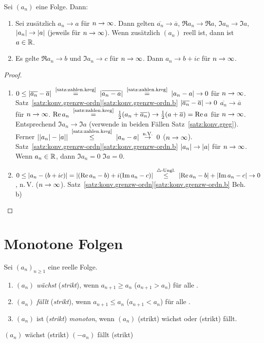 \documentclass[12pt]{scrreprt}
\begin{document}
\begin{satz}
\label{satz:konv.grenzw-komplex}
Sei $(a_n)$ eine Folge. Dann:
\begin{enumerate}
\item Sei zusätzlich $a_n\to a$ für $n\rightarrow\infty$. Dann gelten $\overline{a_n}\to\overline{a}$, $\Re{a_n}\to\Re{a}$, $\Im{a_n}\to\Im{a}$, $\left\lvert a_n\right\lvert\to\left\lvert a\right\lvert$ (jeweils für $n\rightarrow\infty$). Wenn zusätzlich $(a_n)$ reell ist, dann ist $a\in\mathbb{R}$.
\item Es gelte $\Re{a_n}\to b$ und $\Im{a_n}\to c$ für $n\rightarrow\infty$. Dann $a_n\to b+ic$ für $n\rightarrow\infty$.
\end{enumerate}
\end{satz}
\begin{proof}
\begin{enumerate}
\item $0\le\abs{\overline{a_n}-\overline{a}} \nach{=}{\ref{satz:zahlen.kreg}} \abs{\overline{a_n-a}} \nach{=}{\ref{satz:zahlen.kreg}} \abs{a_n-a}\to0$ für $n\rightarrow\infty$. Satz~\ref{satz:konv.grenzw-ordn}\ref{satz:konv.grenzw-ordn.b} \folgt $\left\lvert\overline{a_n}-\overline{a}\right\lvert\to0$ \folgt $\overline{a_n}\to\overline{a}$ für $n\rightarrow\infty$. \folgt $\Re{a_n} \nach{=}{\ref{satz:zahlen.kreg}} \frac12(a_n+\overline{a_n})\to\frac12(a+\overline{a})=\Re{a}$ für $n\rightarrow\infty$. Entsprechend $\Im{a_n}\to\Im{a}$ (verwende in beiden Fällen Satz~\ref{satz:konv.greg}). Ferner $\abs{\abs{a_n}-\abs{a}} \nach{\le}{\ref{satz:zahlen.kreg}} |a_n-a| \nach{\ra}{n.V.} 0$ ($n\rightarrow\infty$). Satz~\ref{satz:konv.grenzw-ordn}\ref{satz:konv.grenzw-ordn.b} \folgt $\left\lvert a_n\right\lvert\to\left\lvert a\right\lvert$ für $n\rightarrow\infty$. Wenn $a_n\in\mathbb{R}$, dann $\Im{a_n}=0$ \folgt $\Im{a}=0$.
\item $0\le\abs{a_n-(b+ic)}=\abs{(\Re{a_n}-b)+i(\Im{a_n}-c)} \nach{\le}{$\triangle$-Ungl.} \abs{\Re{a_n}-b}+\abs{\Im{a_n}-c}\to0$, n.\,V. ($n\rightarrow\infty$). Satz~\ref{satz:konv.grenzw-ordn}\ref{satz:konv.grenzw-ordn.b} \folgt Beh. b)
\end{enumerate}
\end{proof}

\section{Monotone Folgen}
\label{sec:konv.folge-monoton}

\begin{dfn}
\label{dfn:konv.monotonie}
Sei $(a_n)_{n\ge1}$ eine reelle Folge.
\begin{enumerate}
\item $(a_n)$ \emph{wächst} (\emph{strikt}), wenn $a_{n+1}\ge a_n$ ($a_{n+1}>a_n$) für alle .
\item $(a_n)$ \emph{fällt} (\emph{strikt}), wenn $a_{n+1}\le a_n$ ($a_{n+1}<a_n$) für alle .
\item $(a_n)$ ist (\emph{strikt}) \emph{monoton}, wenn $(a_n)$ (strikt) wächst oder (strikt) fällt.
\end{enumerate}
\begin{bem*}
$(a_n)$ wächst (strikt) \gdw $\left(-a_n\right)$ fällt (strikt)
\end{bem*}
\end{dfn}
\end{document}
